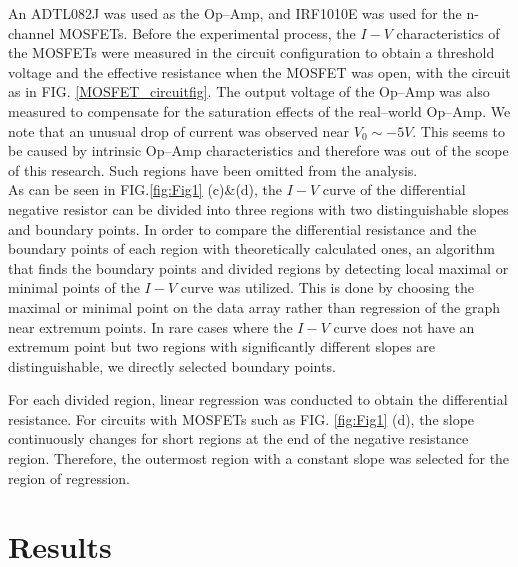 \documentclass[%
 aip,
amsmath,amssymb,
reprint,
]{revtex4-1}
\begin{document}
An ADTL082J was used as the Op--Amp, and IRF1010E was used for the n-channel MOSFETs. Before the experimental process, the $I-V$ characteristics of the MOSFETs were measured in the circuit configuration to obtain a threshold voltage and the effective resistance when the MOSFET was open, with the circuit as in FIG. \ref{MOSFET_circuitfig}. The output voltage of the Op--Amp was also measured to compensate for the saturation effects of the real--world Op--Amp. We note that an unusual drop of current was observed near $V_0\sim-5V$. This seems to be caused by intrinsic Op--Amp characteristics and therefore was out of the scope of this research. Such regions have been omitted from the analysis.\\

As can be seen in FIG.\ref{fig:Fig1} (c)\&(d), the $I-V$ curve of the differential negative resistor can be divided into three regions with two distinguishable slopes and boundary points. In order to compare the differential resistance and the boundary points of each region with theoretically calculated ones, an algorithm that finds the boundary points and divided regions by detecting local maximal or minimal points of the $I-V$ curve was utilized. This is done by choosing the maximal or minimal point on the data array rather than regression of the graph near extremum points. In rare cases where the $I-V$ curve does not have an extremum point but two regions with significantly different slopes are distinguishable, we directly selected boundary points.

For each divided region, linear regression was conducted to obtain the differential resistance. For circuits with MOSFETs such as FIG. \ref{fig:Fig1} (d), the slope continuously changes for short regions at the end of the negative resistance region. Therefore, the outermost region with a constant slope was selected for the region of regression.


\section{\label{sec:Result} Results}
\end{document}
